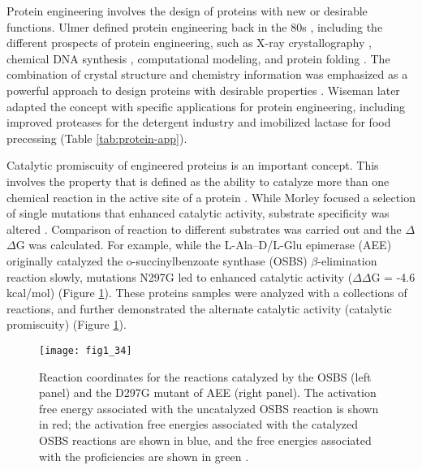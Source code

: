 \begin{refsection}
Protein engineering involves the design of proteins with new or desirable
functions. Ulmer  defined protein engineering back
in the 80s \cite{Ulmer1983}, including the different prospects of
protein engineering, such as X-ray crystallography \cite{Takeda2006}, chemical
DNA synthesis \cite{Pannekoek1979}, computational modeling, and protein folding
\cite{Ulmer1983}. The combination of crystal structure and chemistry
information was emphasized as a powerful approach to design proteins with
desirable properties \cite{Ulmer1983}. Wiseman  later adapted the
concept with specific applications for protein engineering, including improved
proteases for the detergent industry \cite{Wiseman1993,Harwood1992} and
imobilized lactase for food precessing \cite{Wiseman1993} (Table
\ref{tab:protein-app}). 

Catalytic promiscuity of engineered proteins is an important concept. This
involves the property that is defined as the ability to catalyze more than one
chemical reaction in the active site of a protein \cite{Kazlauskas2005a}. While
Morley  focused a selection of single mutations that enhanced
catalytic activity, substrate specificity was altered \cite{Morley2005a}.
Comparison of reaction to different substrates was carried out and the
$\Delta$$\Delta$G was calculated. For example, while the L-Ala–D/L-Glu
epimerase (AEE) originally catalyzed the o-succinylbenzoate synthase (OSBS)
$\beta$-elimination reaction slowly, mutations N297G led to enhanced catalytic
activity ($\Delta$$\Delta$G = -4.6 kcal/mol) (Figure
\ref{fig:protein-engineering-example}). These proteins samples were analyzed
with a collections of reactions, and further demonstrated the alternate
catalytic activity (catalytic promiscuity) \cite{Kazlauskas2005a,Schmidt2003}
(Figure \ref{fig:protein-engineering-example}).
\begin{figure}[htbp] \centering \texttt{[image: fig1\_34]}
    \caption[Reaction coordinates for the reactions catalyzed by the OSBS (left
    panel) and the D297G mutant of AEE (right panel). The activation free
energy associated with the uncatalyzed OSBS reaction is shown in red; the
activation free energies associated with the catalyzed OSBS reactions are shown
in blue, and the free energies associated with the proficiencies are shown in
green.]{Reaction coordinates for the reactions catalyzed by the OSBS (left
    panel) and the D297G mutant of AEE (right panel). The activation free
    energy associated with the uncatalyzed OSBS reaction is shown in red; the
    activation free energies associated with the catalyzed OSBS reactions are
    shown in blue, and the free energies associated with the proficiencies are
    shown in green \cite{Schmidt2003}.}
    \label{fig:protein-engineering-example}
\end{figure}


\end{refsection}
